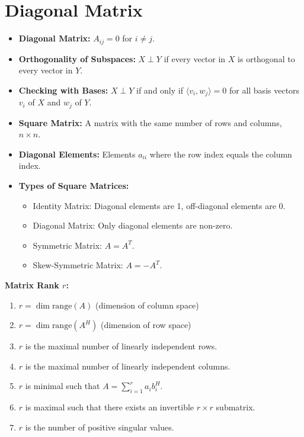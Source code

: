 \documentclass{article}
\begin{document}
\section*{Diagonal Matrix}
\begin{itemize}
    \item \textbf{Diagonal Matrix:} \( A_{ij} = 0 \) for \( i \neq j \).
\end{itemize}










\begin{itemize}[left=0pt]
    \item \textbf{Orthogonality of Subspaces:} \( X \perp Y \) if every vector in \( X \) is orthogonal to every vector in \( Y \).
    
    \item \textbf{Checking with Bases:} \( X \perp Y \) if and only if \( \langle v_i, w_j \rangle = 0 \) for all basis vectors \( v_i \) of \( X \) and \( w_j \) of \( Y \).
\end{itemize}

\begin{itemize}[left=0pt]
    \item \textbf{Square Matrix:} A matrix with the same number of rows and columns, \( n \times n \).
    
    \item \textbf{Diagonal Elements:} Elements \( a_{ii} \) where the row index equals the column index.
    
    \item \textbf{Types of Square Matrices:}
    \begin{itemize}[left=0pt]
        \item Identity Matrix: Diagonal elements are 1, off-diagonal elements are 0.
        \item Diagonal Matrix: Only diagonal elements are non-zero.
        \item Symmetric Matrix: \( A = A^T \).
        \item Skew-Symmetric Matrix: \( A = -A^T \).
    \end{itemize}
\end{itemize}

\textbf{Matrix Rank \( r \):}
\begin{enumerate}
    \item \( r = \dim \text{range}(A) \) (dimension of column space)
    \item \( r = \dim \text{range}(A^H) \) (dimension of row space)
    \item \( r \) is the maximal number of linearly independent rows.
    \item \( r \) is the maximal number of linearly independent columns.
    \item \( r \) is minimal such that \( A = \sum_{i=1}^r a_i b_i^H \).
    \item \( r \) is maximal such that there exists an invertible \( r \times r \) submatrix.
    \item \( r \) is the number of positive singular values.
\end{enumerate}
\end{document}
